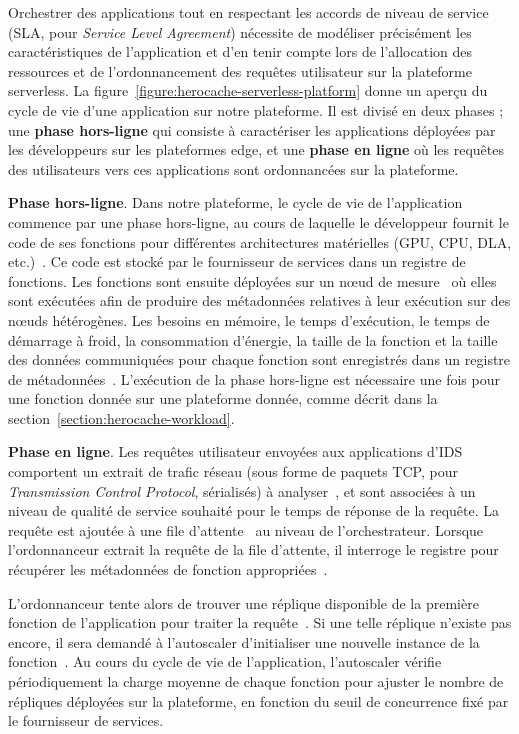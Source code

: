 Orchestrer des applications tout en respectant les accords de niveau de service (\gls{SLA}, pour \textit{Service Level Agreement}) nécessite de modéliser précisément les caractéristiques de l'application et d'en tenir compte lors de l'allocation des ressources et de l'ordonnancement des requêtes utilisateur sur la plateforme serverless. La figure~\ref{figure:herocache-serverless-platform} donne un aperçu du cycle de vie d'une application sur notre plateforme. Il est divisé en deux phases ; une \textbf{phase hors-ligne} qui consiste à caractériser les applications déployées par les développeurs sur les plateformes edge, et une \textbf{phase en ligne} où les requêtes des utilisateurs vers ces applications sont ordonnancées sur la plateforme.

\textbf{Phase hors-ligne}. Dans notre plateforme, le cycle de vie de l'application commence par une phase hors-ligne, au cours de laquelle le développeur fournit le code de ses fonctions pour différentes architectures matérielles (\gls{GPU}, \gls{CPU}, \gls{DLA}, etc.)~. Ce code est stocké par le fournisseur de services dans un registre de fonctions. Les fonctions sont ensuite déployées sur un nœud de mesure~ où elles sont exécutées afin de produire des métadonnées relatives à leur exécution sur des nœuds hétérogènes. Les besoins en mémoire, le temps d'exécution, le temps de démarrage à froid, la consommation d'énergie, la taille de la fonction et la taille des données communiquées pour chaque fonction sont enregistrés dans un registre de métadonnées~. L'exécution de la phase hors-ligne est nécessaire une fois pour une fonction donnée sur une plateforme donnée, comme décrit dans la section~\ref{section:herocache-workload}.

\textbf{Phase en ligne}. Les requêtes utilisateur envoyées aux applications d'\gls{IDS} comportent un extrait de trafic réseau (sous forme de paquets \gls{TCP}, pour \textit{Transmission Control Protocol}, sérialisés) à analyser~, et sont associées à un niveau de qualité de service souhaité pour le temps de réponse de la requête. La requête est ajoutée à une file d'attente~ au niveau de l'orchestrateur. Lorsque l'ordonnanceur extrait la requête de la file d'attente, il interroge le registre pour récupérer les métadonnées de fonction appropriées~.

L'ordonnanceur tente alors de trouver une réplique disponible de la première fonction de l'application pour traiter la requête~. Si une telle réplique n'existe pas encore, il sera demandé à l'autoscaler d'initialiser une nouvelle instance de la fonction~. Au cours du cycle de vie de l'application, l'autoscaler vérifie périodiquement la charge moyenne de chaque fonction pour ajuster le nombre de répliques déployées sur la plateforme, en fonction du seuil de concurrence fixé par le fournisseur de services.

